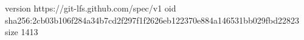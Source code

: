 version https://git-lfs.github.com/spec/v1
oid sha256:2cb03b106f284a34b7cd2f297f1f2626eb122370e884a146531bb029fbd22823
size 1413

